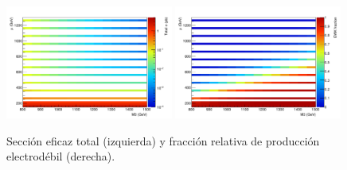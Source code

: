 \begin{figure}[!htb]
  \centering
  \includegraphics[width=0.49\textwidth]{figures/SigXsec_total}
  \includegraphics[width=0.49\textwidth]{figures/SigXsec_ewkFrac}
  \caption{Sección eficaz total (izquierda) y fracción relativa
    de producción electrodébil (derecha).}
  \label{fig:signal_xs_total}
\end{figure}
